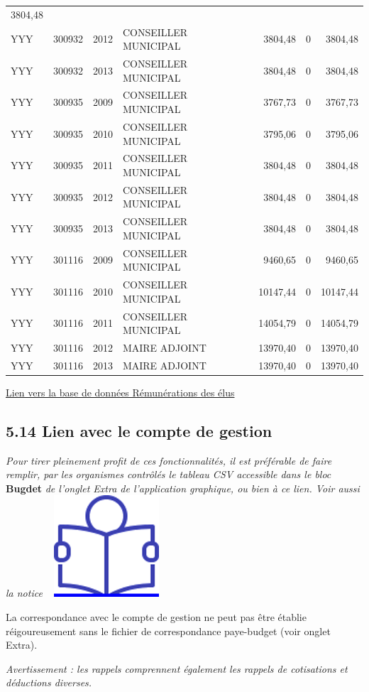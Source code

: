 \begin{longtable}[]{@{}llrlrrr@{}}
3804,48\tabularnewline
YYY & 300932 & 2012 & CONSEILLER MUNICIPAL & 3804,48 & 0 &
3804,48\tabularnewline
YYY & 300932 & 2013 & CONSEILLER MUNICIPAL & 3804,48 & 0 &
3804,48\tabularnewline
YYY & 300935 & 2009 & CONSEILLER MUNICIPAL & 3767,73 & 0 &
3767,73\tabularnewline
YYY & 300935 & 2010 & CONSEILLER MUNICIPAL & 3795,06 & 0 &
3795,06\tabularnewline
YYY & 300935 & 2011 & CONSEILLER MUNICIPAL & 3804,48 & 0 &
3804,48\tabularnewline
YYY & 300935 & 2012 & CONSEILLER MUNICIPAL & 3804,48 & 0 &
3804,48\tabularnewline
YYY & 300935 & 2013 & CONSEILLER MUNICIPAL & 3804,48 & 0 &
3804,48\tabularnewline
YYY & 301116 & 2009 & CONSEILLER MUNICIPAL & 9460,65 & 0 &
9460,65\tabularnewline
YYY & 301116 & 2010 & CONSEILLER MUNICIPAL & 10147,44 & 0 &
10147,44\tabularnewline
YYY & 301116 & 2011 & CONSEILLER MUNICIPAL & 14054,79 & 0 &
14054,79\tabularnewline
YYY & 301116 & 2012 & MAIRE ADJOINT & 13970,40 & 0 &
13970,40\tabularnewline
YYY & 301116 & 2013 & MAIRE ADJOINT & 13970,40 & 0 &
13970,40\tabularnewline
\bottomrule
\end{longtable}

\href{../Bases/Reglementation/remunerations.elu.csv}{Lien vers la base de
données Rémunérations des élus}

\hypertarget{lien-avec-le-compte-de-gestion}{%
\subsection{5.14 Lien avec le compte de
gestion}\label{lien-avec-le-compte-de-gestion}}

\emph{Pour tirer pleinement profit de ces fonctionnalités, il est
préférable de faire remplir, par les organismes contrôlés le tableau CSV
accessible dans le bloc} \textbf{Bugdet} \emph{de l'onglet Extra de
l'application graphique, ou bien à ce lien. Voir aussi la notice} ~
\href{../Docs/Notices/fiche_tableau_budget.odt}{\includegraphics{icones/Notice.png}}

La correspondance avec le compte de gestion ne peut pas être établie
réigoureusement sans le fichier de correspondance paye-budget (voir
onglet Extra).

\emph{Avertissement : les rappels comprennent également les rappels de
cotisations et déductions diverses.}

